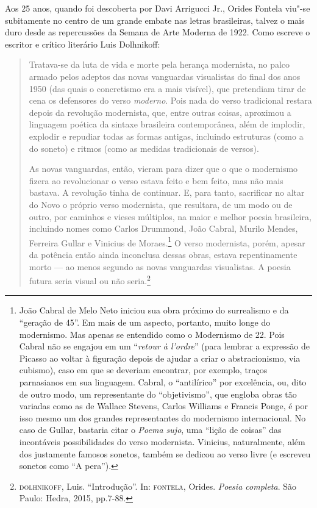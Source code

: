 Aos 25 anos, quando foi descoberta por Davi Arrigucci Jr., Orides Fontela viu"-se subitamente no centro de um grande embate nas letras brasileiras, talvez o mais duro desde as repercussões da Semana de Arte Moderna de 1922.
Como escreve o escritor e crítico literário Luis Dolhnikoff:

\begin{quote}
Tratava-se da luta de vida e morte pela herança modernista, no palco
armado pelos adeptos das novas vanguardas visualistas do ﬁnal dos anos
1950 (das quais o concretismo era a mais visível), que pretendiam tirar
de cena os defensores do verso \emph{moderno}. Pois nada do verso
tradicional restara depois da revolução modernista, que, entre outras
coisas, aproximou a linguagem poética da sintaxe brasileira
contemporânea, além de implodir, explodir e repudiar todas as formas
antigas, incluindo estruturas (como a do soneto) e ritmos (como as
medidas tradicionais de versos).

As novas vanguardas, então, vieram para
dizer que o que o modernismo ﬁzera ao revolucionar o verso estava
feito e bem feito, mas não mais bastava. A revolução tinha de continuar.
E, para tanto, sacriﬁcar no altar do Novo o próprio verso modernista,
que resultara, de um modo ou de outro, por caminhos e vieses
múltiplos, na maior e melhor poesia brasileira, incluindo nomes como
Carlos Drummond, João Cabral, Murilo Mendes, Ferreira Gullar e Vinicius
de Moraes.\footnote{João Cabral de Melo Neto iniciou sua obra próximo do surrealismo e da ``geração de 45''. Em mais de um aspecto, portanto, muito longe do modernismo. Mas
apenas se entendido como o Modernismo de 22. Pois Cabral não se
engajou em um ``\emph{retour à l'ordre}'' (para lembrar a expressão de
Picasso ao voltar à ﬁguração depois de ajudar a criar o abstracionismo, via cubismo), caso em que se deveriam encontrar, por exemplo,
traços parnasianos em sua linguagem. Cabral, o ``antilírico'' por
excelência, ou, dito de outro modo, um representante do
``objetivismo'', que engloba obras tão variadas como as de Wallace
Stevens, Carlos Williams e Francis Ponge, é por isso mesmo um dos
grandes representantes do modernismo internacional. No caso de Gullar,
bastaria citar o \emph{Poema sujo}, uma ``lição de coisas'' das
incontáveis possibilidades do verso modernista. Vinicius, naturalmente,
além dos justamente famosos sonetos, também se dedicou ao verso livre (e
escreveu sonetos como ``A pera'').} O verso modernista, porém, apesar da potência então ainda inconclusa dessas obras, estava repentinamente morto --- ao menos
segundo as novas vanguardas visualistas. A poesia
futura seria visual ou não seria.\footnote{\textsc{dolhnikoff}, Luis. ``Introdução''. In: \textsc{fontela}, Orides. \emph{Poesia completa}. São Paulo: Hedra, 2015, pp.7-88.}
\end{quote}

